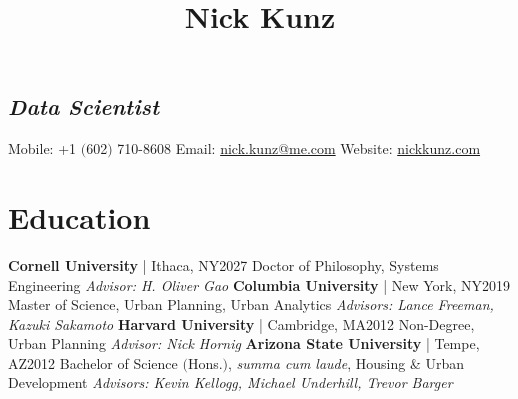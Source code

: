 \documentclass{article}
\title{
    \vspace{-48pt}
    \textbf{Nick Kunz}
    \vspace{-56pt}
}
\date{}
\begin{document}
    \maketitle
    \subsection*{\textit{Data Scientist}}
        Mobile: \space\space\space\space\space+1 $($602$)$ 710-8608\newline
        Email: \space\space\space\space\space\space\url{nick.kunz@me.com}\newline
        Website: \space\space\space\space\url{nickkunz.com}
    \section*{Education}
        \textbf{Cornell University} | Ithaca, NY\hfill{2027}\newline
        Doctor of Philosophy, Systems Engineering\newline
        \textit{Advisor: H. Oliver Gao}\newline\newline
        \textbf{Columbia University} | New York, NY\hfill{2019}\newline
        Master of Science, Urban Planning, Urban Analytics\newline
        \textit{Advisors: Lance Freeman, Kazuki Sakamoto}\newline\newline
        \textbf{Harvard University} | Cambridge, MA\hfill{2012}\newline
        Non-Degree, Urban Planning\newline
        \textit{Advisor: Nick Hornig}\newline\newline
        \textbf{Arizona State University} | Tempe, AZ\hfill{2012}\newline 
        Bachelor of Science $($Hons.$)$, \textit{summa cum laude}, Housing \& Urban Development\newline
        \textit{Advisors: Kevin Kellogg, Michael Underhill, Trevor Barger}
\end{document}
